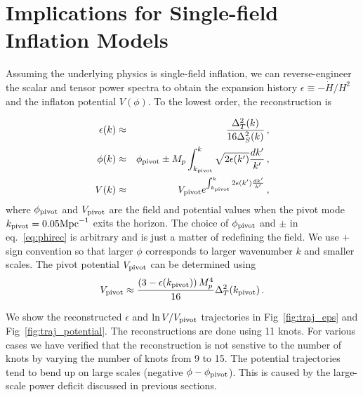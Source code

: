 \documentclass[11pt]{article}
\begin{document}
\section{Implications for Single-field Inflation Models}

Assuming the underlying physics is single-field inflation, we can reverse-engineer the scalar and tensor power spectra to obtain the expansion history $\epsilon \equiv -\dot H/ H^2$ and the inflaton potential $V(\phi)$. To the lowest order, the reconstruction is

\begin{eqnarray}
  \epsilon(k) & \approx & \frac{\Delta^2_T(k)}{16\Delta^2_S(k)} \, , \\
  \phi(k) & \approx & \phi_{\rm pivot} \pm M_p\int^k_{k_{\rm pivot}} \sqrt{2\epsilon(k')} \frac{dk'}{k'}\, , \label{eq:phirec} \\
  V(k) & \approx & V_{\rm pivot}e^{\int^k_{k_{\rm pivot}} 2\epsilon(k') \frac{dk'}{k'}}\, ,
\end{eqnarray}
where $\phi_{\rm pivot}$ and $V_{\rm pivot}$ are the field and potential values when the pivot mode $k_{\rm pivot} = 0.05 {\rm Mpc}^{-1}$ exits the horizon. The choice of $\phi_{\rm pivot}$ and $\pm$ in eq.~\eqref{eq:phirec} is arbitrary and is just a matter of redefining the field. We use $+$ sign convention so that larger $\phi$ corresponds to larger wavenumber $k$ and smaller scales. The pivot potential $V_{\rm pivot}$ can be determined using 
\begin{equation}
V_{\rm pivot} \approx \frac{\left(3-\epsilon(k_{\rm pivot})\right)M_p^4}{16} \Delta^2_T(k_{\rm pivot}) \, .
\end{equation}

We show the reconstructed $\epsilon$ and $\ln V/V_{\rm pivot}$ trajectories in Fig~\ref{fig:traj_eps} and Fig~\ref{fig:traj_potential}. The reconstructions are done using 11 knots. For various cases we have verified that the reconstruction is not senstive to the number of knots by varying the number of knots from 9 to 15. The potential trajectories tend to bend up on large scales (negative $\phi - \phi_{\rm pivot}$). This is caused by the large-scale power deficit discussed in previous sections. 
\end{document}
